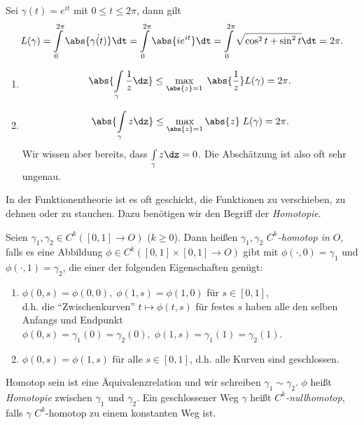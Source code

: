 \begin{bsp}
\label{bsp:2.16}
Sei $\gamma(t) = e^{it}$ mit $0\le t\le 2\pi$, dann gilt
\begin{align*}
L(\gamma) = \int\limits_0^{2\pi} \abs{\dot{\gamma(t)}}\dt =
\int\limits_0^{2\pi} \abs{ie^{it}}\dt
= \int\limits_0^{2\pi} \sqrt{\cos^2 t+\sin^2 t}\dt =  2\pi.
\end{align*}
\begin{enumerate}
  \item 
\begin{align*}
\abs{\int\limits_\gamma \frac{1}{z}\dz} \le
\max\limits_{\abs{z}=1}\;\abs{\frac{1}{z}} L(\gamma) = 2\pi.
\end{align*}
\item
\begin{align*}
\abs{\int\limits_\gamma z\dz} \le \max\limits_{\abs{z}=1}\abs{z}\;
L(\gamma) = 2\pi.
\end{align*}
Wir wissen aber bereits, dass $\int\limits_\gamma z\dz = 0$. Die Abschätzung
ist also oft sehr ungenau.\bsphere
\end{enumerate}
\end{bsp}

In der Funktionentheorie ist es oft geschickt, die Funktionen zu verschieben, zu
dehnen oder zu stauchen. Dazu benötigen wir den Begriff der \emph{Homotopie}.

\begin{defn}
\label{defn:2.17}
Seien $\gamma_1,\gamma_2\in C^k([0,1]\to O)$ ($k\ge0$). Dann heißen
$\gamma_1,\gamma_2$ \emph{$C^k$-homotop in $O$}, falls es eine Abbildung
$\phi\in C^k([0,1]\times[0,1]\to O)$ gibt mit $\phi(\cdot,0) = \gamma_1$ und
$\phi(\cdot,1) = \gamma_2$, die einer der folgenden Eigenschaften genügt:
\begin{enumerate}
  \item $\phi(0,s) = \phi(0,0),\; \phi(1,s) = \phi(1,0)$ für $s\in[0,1]$,\\ d.h.
  die ``Zwischenkurven'' $t\mapsto \phi(t,s)$ für festes $s$ haben alle den
  selben Anfangs und Endpunkt $\phi(0,s) = \gamma_1(0) = \gamma_2(0),
  \; \phi(1,s) = \gamma_1(1) = \gamma_2(1)$.
  \item $\phi(0,s) = \phi(1,s)$ für alle $s\in[0,1]$, d.h. alle Kurven sind geschlossen.
\end{enumerate}
Homotop sein ist eine Äquivalenzrelation und wir schreiben
$\gamma_1\sim\gamma_2$. $\phi$ heißt \emph{Homotopie} zwischen $\gamma_1$ und
$\gamma_2$. Ein geschlossener Weg $\gamma$ heißt \emph{$C^k$-nullhomotop}, falls
$\gamma$ $C^k$-homotop zu einem konstanten Weg ist.\fishhere
\end{defn}

